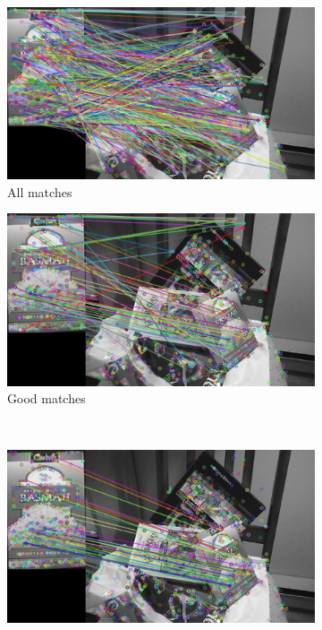 \documentclass[a4paper]{article}
\begin{document}
\begin{figure}[h!]
    \centering
    \begin{subfigure}[b]{0.45\textwidth}
        \includegraphics[width=\textwidth]{Data2_AllMatches_0_0_ratio3_RRT3_NF1000.png}
        \caption{All matches}
        \label{fig:allmatches}
    \end{subfigure}
    \quad
    \begin{subfigure}[b]{0.45\textwidth}
        \includegraphics[width=\textwidth]{Data2_GoodMatches_0_0_ratio3_RRT3_NF1000.png}
        \caption{Good matches}
        \label{fig:goodmatches}
    \end{subfigure}
    \\
    \begin{subfigure}[b]{0.45\textwidth}
        \includegraphics[width=\textwidth]{Data2_RANMatches_0_0_ratio3_RRT3_NF1000.png}

\end{subfigure}
\end{figure}
\end{document}
